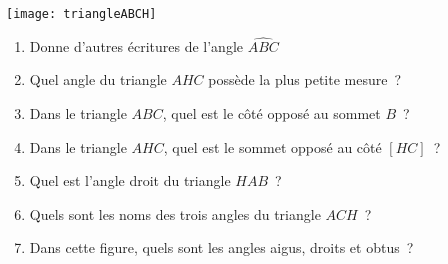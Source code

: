 \begin{activite}

\texttt{[image: triangleABCH]}

\begin{enumerate}
\item Donne d'autres écritures de l'angle $\widehat{ABC}$ \dotfill

\item Quel angle du triangle $AHC$ possède la plus petite mesure ?  \dotfill

\item Dans le triangle $ABC$, quel est le côté opposé au sommet $B$ ?  \dotfill

\item Dans le triangle $AHC$, quel est le sommet opposé au côté $[HC]$ ?  \dotfill

\item Quel est l'angle droit du triangle $HAB$ ?  \dotfill

\item Quels sont les noms des trois angles du triangle $ACH$ ?  \dotfill

\item Dans cette figure, quels sont les angles aigus, droits et obtus ?  \dotfill

 \dotfill

 \dotfill
\end{enumerate}

\end{activite}


